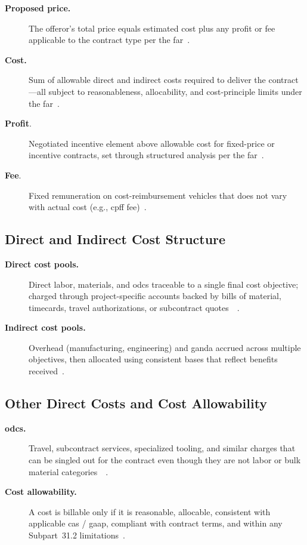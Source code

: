 \documentclass[../main.tex]{subfiles}
\begin{document}
\begin{description}
  \item[\textbf{Proposed price.}] The offeror's total price equals estimated cost plus any profit or fee applicable to the contract type per the \ac{far}~\autocite[\S~15.401]{FAR}.
  \item[\textbf{Cost.}] Sum of allowable direct and indirect costs required to deliver the contract---all subject to reasonableness, allocability, and cost-principle limits under the \ac{far}~\autocite[\S\S~31.201-2, 31.202, 31.203]{FAR}.
  \item[\textbf{Profit}.] Negotiated incentive element above allowable cost for fixed-price or incentive contracts, set through structured analysis per the \ac{far}~\autocite[\S~15.404-4(a)]{FAR}.
  \item[\textbf{Fee}.] Fixed remuneration on cost-reimbursement vehicles that does not vary with actual cost (e.g., \ac{cpff} fee)~\autocite[\S~16.306(a)]{FAR}.
\end{description}

\subsection{Direct and Indirect Cost Structure}
\begin{description}
  \item[\textbf{Direct cost pools.}] Direct labor, materials, and \acp{odc} traceable to a single final cost objective; charged through project-specific accounts backed by bills of material, timecards, travel authorizations, or subcontract quotes~\autocite[\S~31.202]{FAR}~\autocite{edo-3-2-4-cost-price-evaluation-2024}.
  \item[\textbf{Indirect cost pools.}] Overhead (manufacturing, engineering) and \ac{ganda} accrued across multiple objectives, then allocated using consistent bases that reflect benefits received~\autocite[\S~31.203]{FAR}.
\end{description}

\subsection{Other Direct Costs and Cost Allowability}
\begin{description}
  \item[\textbf{\acp{odc}.}] Travel, subcontract services, specialized tooling, and similar charges that can be singled out for the contract even though they are not labor or bulk material categories~\autocite[\S~31.202]{FAR}~\autocite{edo-3-2-4-cost-price-evaluation-2024}.
  \item[\textbf{Cost allowability.}] A cost is billable only if it is reasonable, allocable, consistent with applicable \ac{cas} / \ac{gaap}, compliant with contract terms, and within any Subpart~31.2 limitations~\autocite[\S~31.201-2]{FAR}.
\end{description}
\end{document}
